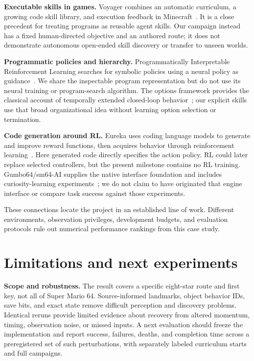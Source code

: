 \documentclass[10pt,letterpaper]{article}
\begin{document}
\textbf{Executable skills in games.} Voyager combines an automatic curriculum, a growing code skill library, and execution feedback in Minecraft~\cite{voyager}. It is a close precedent for treating programs as reusable agent skills. Our campaign instead has a fixed human-directed objective and an authored route; it does not demonstrate autonomous open-ended skill discovery or transfer to unseen worlds.

\textbf{Programmatic policies and hierarchy.} Programmatically Interpretable Reinforcement Learning searches for symbolic policies using a neural policy as guidance~\cite{pirl}. We share the inspectable program representation but do not use its neural training or program-search algorithm. The options framework provides the classical account of temporally extended closed-loop behavior~\cite{options}; our explicit skills use that broad organizational idea without learning option selection or termination.

\textbf{Code generation around RL.} Eureka uses coding language models to generate and improve reward functions, then acquires behavior through reinforcement learning~\cite{eureka}. Here generated code directly specifies the action policy. RL could later replace selected controllers, but the present milestone contains no RL training. Gumbo64/sm64-AI supplies the native interface foundation and includes curiosity-learning experiments~\cite{gumbo}; we do not claim to have originated that engine interface or compare task success against those experiments.

These connections locate the project in an established line of work. Different environments, observation privileges, development budgets, and evaluation protocols rule out numerical performance rankings from this case study.

\section{Limitations and next experiments}
\textbf{Scope and robustness.} The result covers a specific eight-star route and first key, not all of Super Mario 64. Source-informed landmarks, object behavior IDs, save bits, and exact state remove difficult perception and discovery problems. Identical reruns provide limited evidence about recovery from altered momentum, timing, observation noise, or missed inputs. A next evaluation should freeze the implementation and report success, failures, deaths, and completion time across a preregistered set of such perturbations, with separately labeled curriculum starts and full campaigns.
\end{document}
